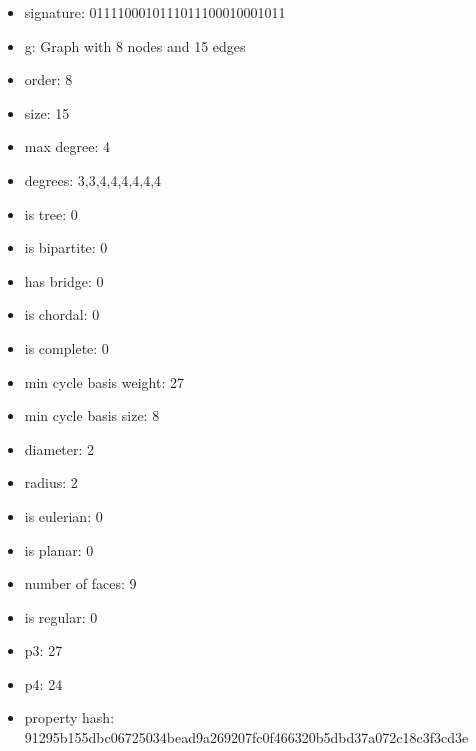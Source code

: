 \begin{itemize}
\item signature: 0111100010111011100010001011
\item g: Graph with 8 nodes and 15 edges
\item order: 8
\item size: 15
\item max degree: 4
\item degrees: 3,3,4,4,4,4,4,4
\item is tree: 0
\item is bipartite: 0
\item has bridge: 0
\item is chordal: 0
\item is complete: 0
\item min cycle basis weight: 27
\item min cycle basis size: 8
\item diameter: 2
\item radius: 2
\item is eulerian: 0
\item is planar: 0
\item number of faces: 9
\item is regular: 0
\item p3: 27
\item p4: 24
\item property hash: 91295b155dbc06725034bead9a269207fc0f466320b5dbd37a072c18c3f3cd3e
\end{itemize}
\newpage
\begin{figure}
\end{figure}
